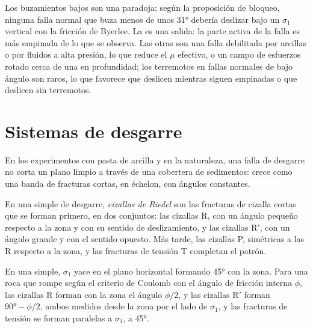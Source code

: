 Los buzamientos bajos son una paradoja: según la proposición de bloqueo, ninguna falla normal
que buza menos de unos \ang{31} debería deslizar bajo un $\sigma_1$ vertical
con la fricción de Byerlee. La  es una salida: la parte activa de la
falla es más empinada de lo que se observa. Las otras son una falla debilitada por arcillas
o por fluidos a alta presión, lo que reduce el $\mu$ efectivo, o un campo de
esfuerzos rotado cerca de una  en profundidad; los terremotos en fallas normales de bajo ángulo
son raros, lo que favorece que deslicen mientras siguen empinadas o que deslicen sin terremotos.

\section{Sistemas de desgarre}\label{sec:b3:extension-strike-slip:strike-slip}

En los experimentos con pasta de arcilla y en la naturaleza, una falla de desgarre no corta un
plano limpio a través de una cobertera de sedimentos: crece como una banda de fracturas cortas,
en échelon, con ángulos constantes.

\begin{definition}\label{def:b3:extension-strike-slip:riedel}
En una  simple de desgarre, \emph{cizallas de Riedel}
son las fracturas de cizalla cortas que se forman primero, en dos conjuntos: las cizallas R,
con un ángulo pequeño respecto a la zona y con su sentido de deslizamiento, y las cizallas R$'$,
con un ángulo grande y con el sentido opuesto. Más tarde, las cizallas P, simétricas
a las R respecto a la zona, y las fracturas de tensión T completan el patrón.
\end{definition}

\begin{proposition}\label{prop:b3:extension-strike-slip:riedel}
En una  simple, $\sigma_1$ yace en el plano horizontal formando
\ang{45} con la zona. Para una roca que rompe según el criterio de Coulomb con el
ángulo de fricción interna $\phi$, las cizallas R forman con la zona el ángulo $\phi/2$, y las
cizallas R$'$ forman $\ang{90} - \phi/2$, ambos medidos desde la zona
por el lado de $\sigma_1$, y las fracturas de tensión se forman paralelas a $\sigma_1$,
a \ang{45}.
\end{proposition}

